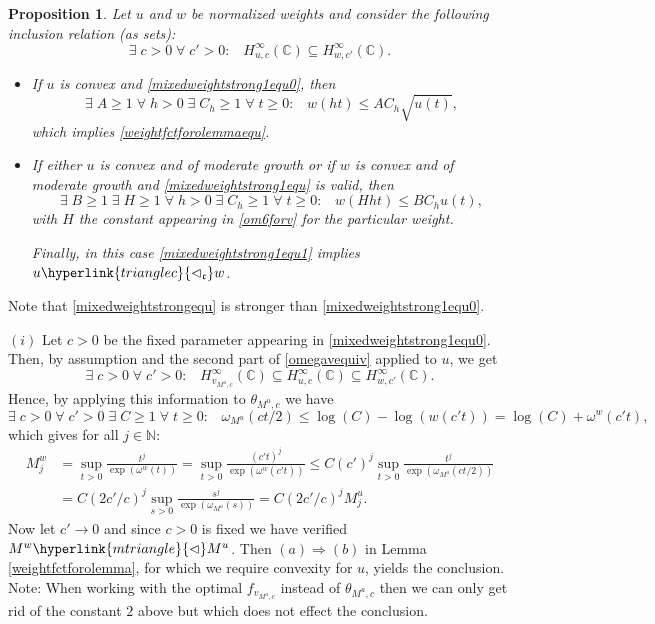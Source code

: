 \documentclass[10pt]{amsart}%
\numberwithin{equation}{section}
\theoremstyle{plain}
\newtheorem{proposition}{Proposition}[section]
\newcommand{\CC}{\mathbb{C}}
\newcommand{\NN}{\mathbb{N}}
\begin{document}
\begin{proposition}\label{mixedweightstrong1}
	Let $u$ and $w$ be normalized weights and consider the following inclusion relation (as sets):
	\begin{equation}\label{mixedweightstrong1equ0}
		\exists\;c>0\;\forall\;c'>0:\;\;\;H^{\infty}_{u,c}(\CC)\subseteq H^{\infty}_{w,c'}(\CC).
	\end{equation}
	\begin{itemize}
		\item[$(i)$] If $u$ is convex and \eqref{mixedweightstrong1equ0}, then
\begin{equation}\label{mixedweightstrong1equ}
		\exists\;A\ge 1\;\forall\;h>0\;\exists\;C_h\ge 1\;\forall\;t\ge 0:\;\;\;w(ht)\le AC_h\sqrt{u(t)},
\end{equation}
		which implies \eqref{weightfctforolemmaequ}.
		\item[$(ii)$] If either $u$ is convex and of moderate growth or if $w$ is convex and of moderate growth and \eqref{mixedweightstrong1equ} is valid, then
		\begin{equation}\label{mixedweightstrong1equ1}
			\exists\;B\ge 1\;\exists\;H\ge 1\;\forall\;h>0\;\exists\;C_h\ge 1\;\forall\;t\ge 0:\;\;\;w(Hht)\le BC_hu(t),
		\end{equation}
		with $H$ the constant appearing in \eqref{om6forv} for the particular weight.
		
		Finally, in this case \eqref{mixedweightstrong1equ1} implies $u\hyperlink{trianglec}{\vartriangleleft_{\mathfrak{c}}}w$.
	\end{itemize}
\end{proposition}

Note that \eqref{mixedweightstrongequ} is stronger than \eqref{mixedweightstrong1equ0}.

$(i)$ Let $c>0$ be the fixed parameter appearing in \eqref{mixedweightstrong1equ0}. Then, by assumption and the second part of \eqref{omegavequiv} applied to $u$, we get
$$\exists\;c>0\;\forall\;c'>0:\;\;\;H^{\infty}_{v_{M^u,c}}(\CC)\subseteq H^{\infty}_{u,c}(\CC)\subseteq H^{\infty}_{w,c'}(\CC).$$
Hence, by applying this information to $\theta_{M^u,c}$ we have
$$\exists\;c>0\;\forall\;c'>0\;\exists\;C\ge 1\;\forall\;t\ge 0:\;\;\;\omega_{M^u}(ct/2)\le\log(C)-\log(w(c't))=\log(C)+\omega^{w}(c't),$$
which gives for all $j\in\NN$:
\begin{align*}
	M^{w}_j&=\sup_{t>0}\frac{t^j}{\exp(\omega^{w}(t))}=\sup_{t>0}\frac{(c't)^j}{\exp(\omega^{w}(c't))}\le C(c')^j\sup_{t>0}\frac{t^j}{\exp(\omega_{M^{u}}(ct/2))}
	\\&
	=C(2c'/c)^j\sup_{s>0}\frac{s^j}{\exp(\omega_{M^{u}}(s))}=C(2c'/c)^jM^u_j.
\end{align*}
Now let $c'\rightarrow 0$ and since $c>0$ is fixed we have verified $M^w\hyperlink{mtriangle}{\vartriangleleft}M^u$. Then $(a)\Rightarrow(b)$ in Lemma \ref{weightfctforolemma}, for which we require convexity for $u$, yields the conclusion. Note: When working with the optimal $f_{v_{M^u,c}}$ instead of $\theta_{M^u,c}$ then we can only get rid of the constant $2$ above but which does not effect the conclusion.\vspace{6pt}
\end{document}
